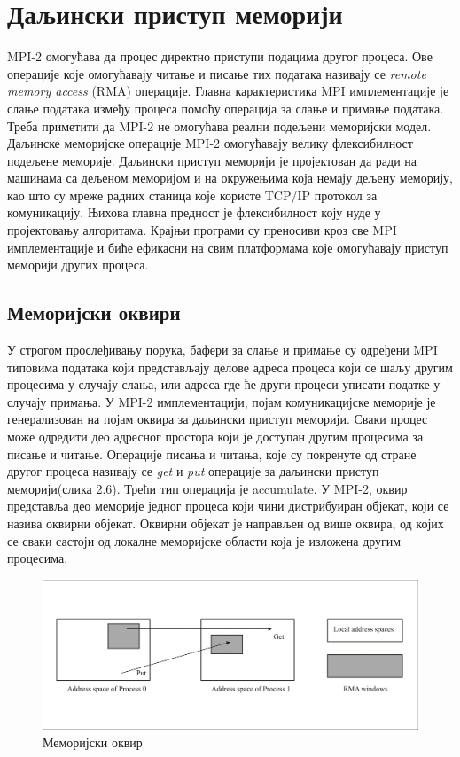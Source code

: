 \section{Даљински приступ меморији}
MPI-2 омогућава да процес директно приступи подацима другог процеса. Ове операције које омогућавају читање и писање тих података називају се \textit{remote memory access} (\gls{RMA}) операције. Главна карактеристика MPI имплементације је слање података између процеса помоћу операција за слање и примање података. 
Треба приметити да MPI-2 не омогућава реални подељени меморијски модел. Даљинске меморијске операције MPI-2 омогућавају велику флексибилност подељене меморије. 
Даљински приступ меморији је пројектован да ради на машинама са дељеном меморијом и на окружењима која немају дељену меморију, као што су мреже радних станица које користе TCP/IP протокол за комуникацију. Њихова главна предност је флексибилност коју нуде у пројектовању алгоритама. Крајњи програми су преносиви кроз све MPI имплементације и биће ефикасни на свим платформама које омогућавају приступ меморији других процеса.

\subsection{Меморијски оквири}

У строгом прослеђивању порука, бафери за слање и примање су одређени MPI типовима података који представљају делове адреса процеса који се шаљу другим процесима у случају слања, или адреса где ће други процеси уписати податке у случају примања. У MPI-2 имплементацији, појам комуникацијске меморије је генерализован на појам оквира за даљински приступ меморији. Сваки процес
може одредити део адресног простора који је доступан другим процесима за писање и читање. Операције писања и читања, које су покренуте од стране другог процеса називају се \textit{get} и \textit{put} операције за даљински приступ меморији(слика 2.6). Трећи тип операција је accumulate. У MPI-2, оквир представља део меморије једног процеса који чини дистрибуиран објекат, који се назива оквирни објекат. Оквирни објекат је направљен од више оквира, од којих се сваки састоји од локалне меморијске области која је изложена другим процесима.

\begin{figure}[h!]
  \centering
      \includegraphics[width=1\textwidth]{slike/mpi_remote.png}
  \caption{Меморијски оквир}
\end{figure}

